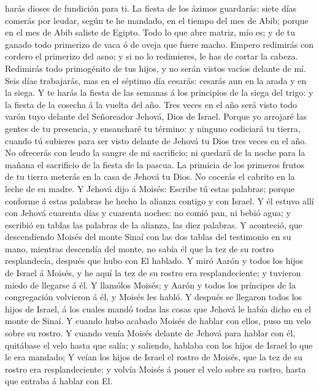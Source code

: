 harás dioses de fundición para ti.  La fiesta de los
ázimos guardarás: siete días comerás por leudar, según te he mandado, en
el tiempo del mes de Abib; porque en el mes de Abib saliste de Egipto.
 Todo lo que abre matriz, mío es; y de tu ganado todo
primerizo de vaca ó de oveja que fuere macho.  Empero
redimirás con cordero el primerizo del asno; y si no lo redimieres, le
has de cortar la cabeza. Redimirás todo primogénito de tus hijos, y no
serán vistos vacíos delante de mí.  Seis días trabajarás,
mas en el séptimo día cesarás: cesarás aun en la arada y en la siega.
 Y te harás la fiesta de las semanas á los principios de
la siega del trigo: y la fiesta de la cosecha á la vuelta del año.
 Tres veces en el año será visto todo varón tuyo delante
del Señoreador Jehová, Dios de Israel.  Porque yo
arrojaré las gentes de tu presencia, y ensancharé tu término: y ninguno
codiciará tu tierra, cuando tú subieres para ser visto delante de Jehová
tu Dios tres veces en el año.  No ofrecerás con leudo la
sangre de mi sacrificio; ni quedará de la noche para la mañana el
sacrificio de la fiesta de la pascua.  La primicia de los
primeros frutos de tu tierra meterás en la casa de Jehová tu Dios. No
cocerás el cabrito en la leche de su madre.  Y Jehová
dijo á Moisés: Escribe tú estas palabras; porque conforme á estas
palabras he hecho la alianza contigo y con Israel.  Y él
estuvo allí con Jehová cuarenta días y cuarenta noches: no comió pan, ni
bebió agua; y escribió en tablas las palabras de la alianza, las diez
palabras.  Y aconteció, que descendiendo Moisés del monte
Sinaí con las dos tablas del testimonio en su mano, mientras descendía
del monte, no sabía él que la tez de su rostro resplandecía, después que
hubo con El hablado.  Y miró Aarón y todos los hijos de
Israel á Moisés, y he aquí la tez de su rostro era resplandeciente; y
tuvieron miedo de llegarse á él.  Y llamólos Moisés; y
Aarón y todos los príncipes de la congregación volvieron á él, y Moisés
les habló.  Y después se llegaron todos los hijos de
Israel, á los cuales mandó todas las cosas que Jehová le había dicho en
el monte de Sinaí.  Y cuando hubo acabado Moisés de
hablar con ellos, puso un velo sobre su rostro.  Y cuando
venía Moisés delante de Jehová para hablar con él, quitábase el velo
hasta que salía; y saliendo, hablaba con los hijos de Israel lo que le
era mandado;  Y veían los hijos de Israel el rostro de
Moisés, que la tez de su rostro era resplandeciente; y volvía Moisés á
poner el velo sobre su rostro, hasta que entraba á hablar con El.

